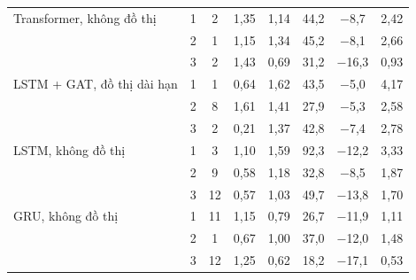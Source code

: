 \begin{tabular}{@{}lccccccc@{}}
\midrule
Transformer, không đồ thị & 1 & 2 & 1{,}35 & 1{,}14 & 44{,}2 & $-$8{,}7 & 2{,}42 \\
 & 2 & 1 & 1{,}15 & 1{,}34 & 45{,}2 & $-$8{,}1 & 2{,}66 \\
 & 3 & 2 & 1{,}43 & 0{,}69 & 31{,}2 & $-$16{,}3 & 0{,}93 \\
\midrule
LSTM + GAT, đồ thị dài hạn & 1 & 1 & 0{,}64 & 1{,}62 & 43{,}5 & $-$5{,}0 & 4{,}17 \\
 & 2 & 8 & 1{,}61 & 1{,}41 & 27{,}9 & $-$5{,}3 & 2{,}58 \\
 & 3 & 2 & 0{,}21 & 1{,}37 & 42{,}8 & $-$7{,}4 & 2{,}78 \\
\midrule
LSTM, không đồ thị & 1 & 3 & 1{,}10 & 1{,}59 & 92{,}3 & $-$12{,}2 & 3{,}33 \\
 & 2 & 9 & 0{,}58 & 1{,}18 & 32{,}8 & $-$8{,}5 & 1{,}87 \\
 & 3 & 12 & 0{,}57 & 1{,}03 & 49{,}7 & $-$13{,}8 & 1{,}70 \\
\midrule
GRU, không đồ thị & 1 & 11 & 1{,}15 & 0{,}79 & 26{,}7 & $-$11{,}9 & 1{,}11 \\
 & 2 & 1 & 0{,}67 & 1{,}00 & 37{,}0 & $-$12{,}0 & 1{,}48 \\
 & 3 & 12 & 1{,}25 & 0{,}62 & 18{,}2 & $-$17{,}1 & 0{,}53 \\
\bottomrule
\end{tabular}
